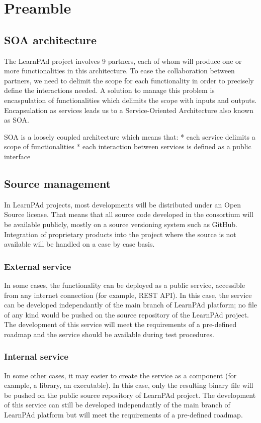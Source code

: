 \chapter{Preamble}
\label{ch:preamble}

\section{SOA architecture}
\label{sec:soa-architecture}

The LearnPAd project involves 9 partners, each of whom will produce one or more functionalities in this architecture.  To ease the collaboration between partners, we need to delimit the scope for each functionality in order to precisely define the interactions needed.  A solution to manage this problem is encaspulation of functionalities which delimits the scope with inputs and outputs.  Encapsulation as services leads us to a Service-Oriented Architecture also known as SOA.

SOA is a loosely coupled architecture which means that:
* each service delimits a scope of functionalities
* each interaction between services is defined as a public interface

\section{Source management}
\label{sec:source-management}

In LearnPAd projects, most developments will be distributed under an Open Source license.  That means that all source code developed in the consortium will be available publicly, mostly on a source versioning system such as GitHub.
Integration of proprietary products into the project where the source is not available will be handled on a case by case basis.

\subsection{External service}
\label{sec:external-service}

In some cases, the functionality can be deployed as a public service, accessible from any internet connection (for example, REST API).  In this case, the service can be developed independantly of the main branch of LearnPAd platform; no file of any kind would be pushed on the source repository of the LearnPAd project.  The development of this service will meet the requirements of a pre-defined roadmap and the service should be available during test procedures.

\subsection{Internal service}
\label{sec:internal-service}

In some other cases, it may easier to create the service as a component (for example, a library, an executable).  In this case, only the resulting binary file will be pushed on the public source repository of LearnPAd project.  The development of this service can still be developed independantly of the main branch of LearnPAd platform but will meet the requirements of a pre-defined roadmap.
